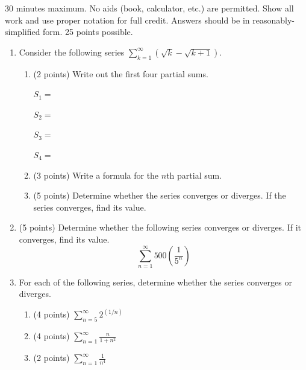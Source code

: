 \documentclass[12pt]{article}
\newcommand{\ds}{\displaystyle}
\begin{document}
30 minutes maximum.  No aids (book, calculator, etc.) are permitted.
Show all work and use proper notation for full credit.  Answers should
be in reasonably-simplified form.  25 points possible.

\begin{enumerate}

\item Consider the following series $\ds \sum_{k=1}^{\infty} \left( \sqrt{k} - \sqrt{k+1} \right)$.
  \begin{enumerate}
  \item (2 points) Write out the first four partial sums.
    \vspace{0.3cm}
    
    $S_1 =$
    \vspace{0.3cm}
    
    $S_2 =$
    \vspace{0.3cm}
    
    $S_3 =$
    \vspace{0.3cm}
    
    $S_4 =$
    \vspace{0.3cm}
    
  \item (3 points) Write a formula for the $n$th partial sum.
    \vfill
    
  \item (5 points) Determine whether the series converges or diverges. If the
    series converges, find its value.
    \vfill
  \end{enumerate}

\item (5 points) Determine whether the following series converges or
  diverges. If it converges, find its value.
  \[
    \sum_{n=1}^{\infty} 500 \left( \frac{1}{5^n} \right)
  \]
  \vfill

  \newpage
  
\item For each of the following series, determine whether the series converges or diverges.
  \begin{enumerate}
  \item (4 points) $\ds \sum_{n=5}^{\infty} 2^{(1/n)}$
    \vfill
    
  \item (4 points) $\ds \sum_{n=1}^{\infty} \frac{n}{1+n^2}$
    \vfill
    \vfill
    
  \item (2 points) $\ds \sum_{n=1}^{\infty} \frac{1}{n^4}$
    \vfill
  \end{enumerate}

\end{enumerate}
\end{document}
